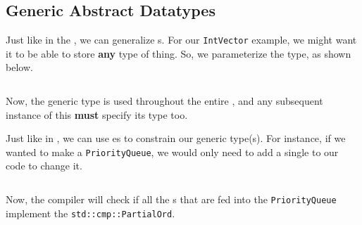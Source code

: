 \subsection{Generic Abstract Datatypes}\label{subsec:Generic_Abstract_Datatypes}
Just like in the , we can generalize s.
For our \texttt{IntVector} example, we might want it to be able to store \textbf{any} type of thing.
So, we parameterize the  type, as shown below.
\inputminted[frame=lines,linenos]{rust}{./EDAP05-Concepts_Programming_Languages-Sections/Abstract_Data_Types/Code/Generic_Vector.rs}

Now, the generic type  is used throughout the entire , and any subsequent instance of this  \textbf{must} specify its type too.

Just like in , we can use es to constrain our generic type(s).
For instance, if we wanted to make a \texttt{PriorityQueue}, we would only need to add a single  to our \texttt{} code to change it.
\inputminted[frame=lines,linenos]{rust}{./EDAP05-Concepts_Programming_Languages-Sections/Abstract_Data_Types/Code/PriorityQueue.rs}

Now, the compiler will check if all the s that are fed into the \texttt{PriorityQueue} implement the  \texttt{std::cmp::PartialOrd}.

